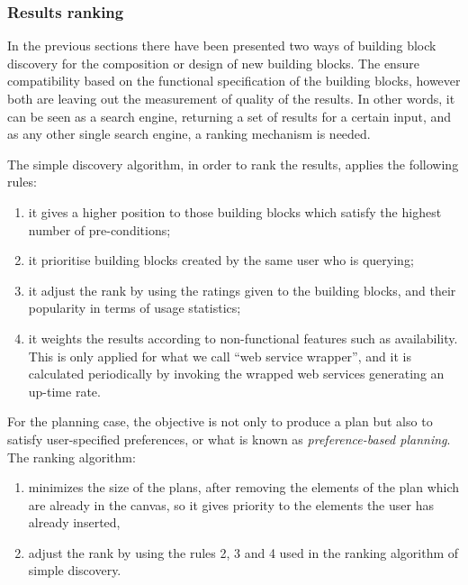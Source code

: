 \subsubsection{Results ranking}
\label{sssec:ranking}

In the previous sections there have been presented two ways of building block discovery for the composition or design of new
building blocks. The ensure compatibility based on the functional specification of the building blocks, however both are leaving
out the measurement of quality of the results. In other words, it can be seen as a search engine, returning a set of results
for a certain input, and as any other single search engine, a ranking mechanism is needed.

The simple discovery algorithm, in order to rank the results, applies the following rules:
\begin{enumerate}
 \item it gives a higher position to those building blocks which satisfy the highest number of pre-conditions;
 \item it prioritise building blocks created by the same user who is querying;
 \item it adjust the rank by using the ratings given to the building blocks, and their popularity in terms of usage statistics;
 \item it weights the results according to non-functional features such as availability. This is only applied for what we call
``web service wrapper'', and it is calculated periodically by invoking the wrapped web services generating an up-time rate.
\end{enumerate}

For the planning case, the objective is not only to produce a plan but also to satisfy user-specified preferences, or what is
known as \emph{preference-based planning}. The ranking algorithm:
\begin{enumerate}
 \item minimizes the size of the plans, after removing the elements of the plan which are already in the canvas, so it gives
priority to the elements the user has already inserted,
 \item adjust the rank by using the rules 2, 3 and 4 used in the ranking algorithm of simple discovery.
\end{enumerate}
